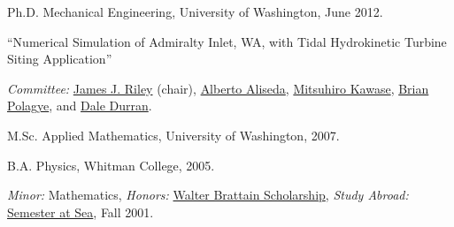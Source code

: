\documentclass[10pt,letterpaper]{article}
\renewenvironment{itemize}{
  \begin{list}{}{
    \setlength{\leftmargin}{1.5em}
    \setlength{\itemsep}{0.25em}
    \setlength{\parskip}{0pt}
    \setlength{\parsep}{0.25em}
  }
}{
  \end{list}
}
\begin{document}
\begin{itemize}

  \item Ph.D. Mechanical Engineering, University of Washington, June 2012.

    \begin{itemize}
	\item   ``Numerical Simulation of Admiralty Inlet, WA, with Tidal Hydrokinetic Turbine Siting Application''
    \item \textit{Committee:}
      \href{http://faculty.washington.edu/rileyj/}{James J. Riley} (chair),
      \href{http://www.me.washington.edu/research/faculty/aaliseda/}{Alberto Aliseda},
      \href{http://faculty.washington.edu/kawase/}{Mitsuhiro Kawase},
      \href{http://www.me.washington.edu/research/faculty/bpolagye/}{Brian Polagye}, and
      \href{http://www.atmos.washington.edu/~durrand/}{Dale Durran}.

    \end{itemize}

  \item M.Sc. Applied Mathematics, University of Washington, 2007.

  \item B.A. Physics, Whitman College, 2005.

    \begin{itemize}

    \item \textit{Minor:} Mathematics, \textit{Honors:} \href{https://www.whitman.edu/content/catalog/financial-aid}{Walter Brattain Scholarship}, \textit{Study Abroad:}
      \href{http://www.semesteratsea.org/}{Semester at Sea},
      Fall 2001.

    \end{itemize}
%
%
%
%

\end{itemize}

\end{document}
